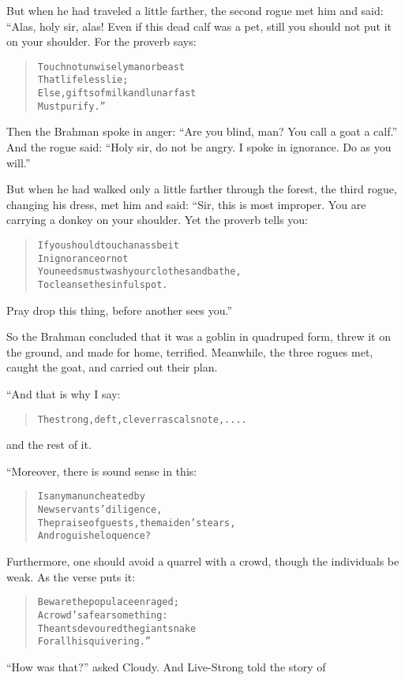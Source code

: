 \documentclass[article, twoside, 10pt]{memoir}
\renewenvironment{verbatim}{%
\begin{quote}%
\vskip -10pt%
\begin{alltt}\normalfont\small}{\end{alltt}%
\end{quote}%
\vskip -10pt
} %
\begin{document}
But when he had traveled a little farther, the second rogue met him
and said: “Alas, holy sir, alas! Even if this dead calf was a pet,
still you should not put it on your shoulder. For the proverb
says:

\begin{verbatim}
Touch not unwisely man or beast
    That lifeless lie;
Else, gifts of milk and lunar fast
    Must purify.”
\end{verbatim}
Then the Brahman spoke in anger:
``Are you blind, man? You call a goat a calf.'' And the rogue said:
``Holy sir, do not be angry. I spoke in ignorance. Do as you will.''

But when he had walked only a little farther through the forest,
the third rogue, changing his dress, met him and said: “Sir, this
is most improper. You are carrying a donkey on your shoulder. Yet
the proverb tells you:

\begin{verbatim}
If you should touch an ass{\textemdash}be it
    In ignorance or not{\textemdash}
You needs must wash your clothes and bathe,
    To cleanse the sinful spot.
\end{verbatim}
Pray drop this thing, before another sees you.”

So the Brahman concluded that it was a goblin in quadruped form,
threw it on the ground, and made for home, terrified. Meanwhile,
the three rogues met, caught the goat, and carried out their plan.

“And that is why I say:

\begin{verbatim}
The strong, deft, clever rascals note, ....
\end{verbatim}
and the rest of it.

“Moreover, there is sound sense in this:

\begin{verbatim}
Is any man uncheated by
    New servants’ diligence,
The praise of guests, the maiden’s tears,
    And roguish eloquence?
\end{verbatim}
Furthermore, one should avoid a quarrel with a crowd, though the
individuals be weak. As the verse puts it:

\begin{verbatim}
Beware the populace enraged;
    A crowd's a fearsome thing:
The ants devoured the giant snake
    For all his quivering.”
\end{verbatim}
``How was that?'' asked Cloudy. And Live-Strong told the story of
\end{document}
